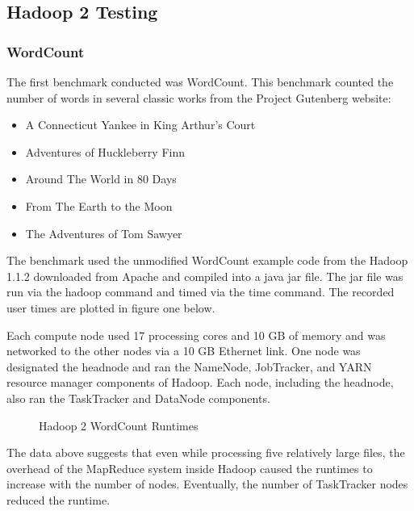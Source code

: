 \documentclass[conference]{IEEEtran}
\begin{document}
			\subsection{Hadoop 2 Testing}
               			\subsubsection{WordCount}
                    				The first benchmark conducted was WordCount. This benchmark counted the number of words in several classic works from the Project Gutenberg website\cite{gutenburg}:
                    				\begin{itemize}
                    				 	\item A Connecticut Yankee in King Arthur's Court\cite{yankee}
                        					\item Adventures of Huckleberry Finn\cite{huck}
                        					\item Around The World in 80 Days\cite{80days}
                      					\item From The Earth to the Moon\cite{moon}
                     					\item The Adventures of Tom Sawyer\cite{tom}
                  				\end{itemize}
						The benchmark used the unmodified WordCount example code from the Hadoop 1.1.2 downloaded from Apache and compiled into a java jar file. The jar file was run via the hadoop command and timed via the time command. The recorded user times are plotted in figure one below.
		
		Each compute node used 17 processing cores and 10 GB of memory and was networked to the other nodes via a 10 GB Ethernet link. One node was designated the headnode and ran the NameNode, JobTracker, and YARN resource manager components of Hadoop. Each node, including the headnode, also ran the TaskTracker and DataNode components.

                  				\begin{figure}[h]
                    					\begin{center}
                        						
                        						\caption{Hadoop 2 WordCount Runtimes}
                    					\end{center}
                  				\end{figure}
		
		The data above suggests that even while processing five relatively large files, the overhead of the MapReduce system inside Hadoop caused the runtimes to increase with the number of nodes. Eventually, the number of TaskTracker nodes reduced the runtime.
\end{document}
